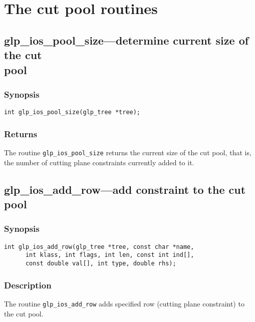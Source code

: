 \newpage

\section{The cut pool routines}

\subsection{glp\_ios\_pool\_size---determine current size of the cut\\
pool}

\subsubsection*{Synopsis}

\begin{verbatim}
int glp_ios_pool_size(glp_tree *tree);
\end{verbatim}

\subsubsection*{Returns}

The routine \verb|glp_ios_pool_size| returns the current size of the
cut pool, that is, the number of cutting plane constraints currently
added to it.

\subsection{glp\_ios\_add\_row---add constraint to the cut pool}

\subsubsection*{Synopsis}

\begin{verbatim}
int glp_ios_add_row(glp_tree *tree, const char *name,
      int klass, int flags, int len, const int ind[],
      const double val[], int type, double rhs);
\end{verbatim}

\subsubsection*{Description}

The routine \verb|glp_ios_add_row| adds specified row (cutting plane
constraint) to the cut pool.


